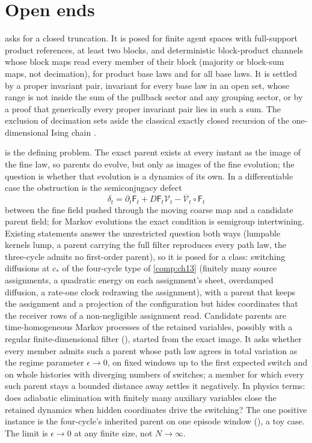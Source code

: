 \section{Open ends}
\label{comp:ch11-open}

 asks for a closed truncation. It is posed for finite agent
spaces with full-support product references, at least two blocks, and deterministic block-product
channels whose block maps read every member of their block (majority or block-sum maps, not
decimation), for product base laws and for all base laws. It is settled by a proper invariant pair,
invariant for every base law in an open set, whose range is not inside the sum of the pullback sector
and any grouping sector, or by a proof that generically every proper invariant pair lies in such a
sum. The exclusion of decimation sets aside the classical exactly closed recursion of the
one-dimensional Ising chain \citep{goldenfeld1992lectures}.

 is the defining problem. The exact parent exists at every
instant as the image of the fine law, so parents do evolve, but only as images of the fine evolution;
the question is whether that evolution is a dynamics of its own. In a differentiable case the
obstruction is the semiconjugacy defect
\[
\delta_t=\partial_t\mathsf F_t+D\mathsf F_t\mathscr V_t-\overline{\mathscr V}_t\circ\mathsf F_t
\]
between the fine field pushed through the moving coarse map and a candidate parent field; for Markov
evolutions the exact condition is semigroup intertwining. Existing statements answer the unrestricted
question both ways (lumpable kernels lump, a parent carrying the full filter reproduces every path law,
the three-cycle admits no first-order parent), so it is posed for a class: switching diffusions at
$c_*$ of the four-cycle type of \cref{comp:ch13} (finitely many source assignments, a quadratic energy
on each assignment's sheet, overdamped diffusion, a rate-one clock redrawing the assignment), with a
parent that keeps the assignment and a projection of the configuration but hides coordinates that the
receiver rows of a non-negligible assignment read. Candidate parents are time-homogeneous Markov
processes of the retained variables, possibly with a regular finite-dimensional filter
(), started from the exact image. It asks whether every member admits
such a parent whose path law agrees in total variation as the regime parameter $\epsilon\to0$, on fixed
windows up to the first expected switch and on whole histories with diverging numbers of switches; a
member for which every such parent stays a bounded distance away settles it negatively. In physics terms: does adiabatic elimination with finitely many auxiliary variables close
the retained dynamics when hidden coordinates drive the switching? The one positive instance is the
four-cycle's inherited parent on one episode window (), a toy
case. The limit is $\epsilon\to0$ at any finite size, not $N\to\infty$.

